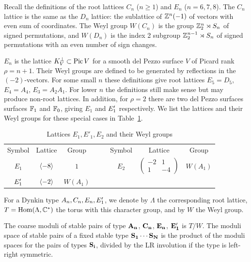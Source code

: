 \documentclass[table,x11names]{amsart}
\begin{document}
Recall the definitions of the root lattices $C_n$ ($n\ge1$) and $E_n$
($n=6,7,8$).  The $C_n$ lattice is the same as the $D_n$ lattice: the
sublattice of ${\mathbb Z}^n(-1)$ of vectors with even sum of coordinates. The
Weyl group $W(C_n)$ is the group ${\mathbb Z}_2^n\rtimes S_n$ of signed permutations,
and $W(D_n)$ is the index
2 subgroup ${\mathbb Z}_2^{n-1}\rtimes S_n$ of signed permutations
with an even number of sign changes.

$E_n$ is the lattice $K_V^\perp\subset\operatorname{Pic} V$
for a smooth del Pezzo surface $V$ of Picard rank $\rho=n+1$.  Their
Weyl groups are defined to be generated by reflections in the
$(-2)$-vectors.
For some small $n$ these definitions give root lattices
$E_5=D_5$, $E_4=A_4$, $E_3=A_2A_1$. For lower
$n$ the definitions still make sense but may produce non-root lattices. In addition,
for $\rho=2$ there are two del Pezzo surfaces surfaces ${\mathbb F}_1$ and
${\mathbb F}_0$, giving $E_1$ and $E'_1$ respectively. We list the lattices
and their Weyl groups for these special cases in
Table~\ref{tab:small-DE}.

\begin{table}[htp!]
  \caption{Lattices $E_1,E'_1,E_2$ and their Weyl groups}
  \label{tab:small-DE}
  \centering
  \begin{tabular}{cccccccc}
    Symbol &Lattice &Group &&&Symbol &Lattice &Group\\
           $E_1$ &$\langle -8\rangle$ &$1$
               &&&$E_2$ &$\begin{pmatrix}-2&1\\1&-4\end{pmatrix}$ &$W(A_1)$\\
           $E'_1$ &$\langle -2\rangle$ &$W(A_1)$\\
    




  \end{tabular}
\end{table}

\begin{definition}
  For a Dynkin type $A_n,C_n,E_n,E'_1$, we denote by $\Lambda$ the
  corresponding root lattice, $T = \operatorname{Hom}(\Lambda, {\mathbb C}^*)$ the torus with
  this character group, and by $W$ the Weyl group.
\end{definition}



\begin{theorem}\label{thm:moduli-slc-pair}
  The coarse moduli of stable pairs of type ${\bf A_n}$, ${\bf C_n}$, 
  ${\bf E_n}$, ${\bf E_1'}$ is $T/W$.
  The moduli space
  of stable pairs of a fixed stable type
  ${\bf S_1}\cdots {\bf S_N}$ is the product of the moduli
  spaces for the pairs of types ${\bf S_i}$, divided by the LR involution
  if the type is left-right symmetric.
\end{theorem}
\end{document}
